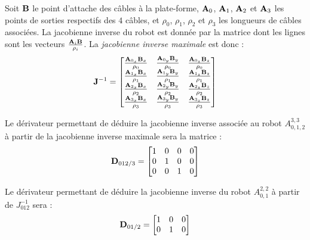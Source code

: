 Soit ${\bf B}$ le point d'attache des c\^ables \`a la plate-forme, ${\bf 
A}_0$, ${\bf A}_1$, ${\bf A}_2$ et ${\bf A}_3$ les points de sorties 
respectifs des $4$ c\^ables, et $\rho_0$, $\rho_1$, $\rho_2$ et $\rho_3$ les 
longueurs de c\^ables associ\'ees. La jacobienne inverse du robot est donn\'ee 
par la matrice dont les lignes sont les vecteurs $\frac {{\bf A}_i{\bf 
B}}{\rho_i}$. La {\it jacobienne inverse maximale} est donc :
\begin{equation}
{\bf J}^{-1} = 
\begin{bmatrix}
\frac {{\bf A}_{0_x}{\bf B}_x} {\rho_0} & \frac {{\bf A}_{0_y}{\bf B}_y} 
{\rho_0} & \frac {{\bf A}_{0_z}{\bf B}_z} {\rho_0} \\
\frac {{\bf A}_{1_x}{\bf B}_x} {\rho_1} & \frac {{\bf A}_{1_y}{\bf B}_y} 
{\rho_1} & \frac {{\bf A}_{1_z}{\bf B}_z} {\rho_1} \\
\frac {{\bf A}_{2_x}{\bf B}_x} {\rho_2} & \frac {{\bf A}_{2_y}{\bf B}_y} 
{\rho_2} & \frac {{\bf A}_{2_z}{\bf B}_z} {\rho_2} \\
\frac {{\bf A}_{3_x}{\bf B}_x} {\rho_3} & \frac {{\bf A}_{3_y}{\bf B}_y} 
{\rho_3} & \frac {{\bf A}_{3_z}{\bf B}_z} {\rho_3} \\
\end{bmatrix}
\label{chap01:eq01}
\end{equation}

Le d\'erivateur permettant de d\'eduire la jacobienne inverse associ\'ee au 
robot $A^{3,3}_{0, 1, 2}$ \`a partir de la jacobienne inverse maximale 
sera la matrice :
\begin{equation}
{\bf D}_{012/3} = 
\begin{bmatrix}
1 & 0 & 0 & 0\\
0 & 1 & 0 & 0\\
0 & 0 & 1 & 0
\end{bmatrix}
\label{chap01:eq02}
\end{equation}

Le d\'erivateur permettant de d\'eduire la jacobienne inverse du robot 
$A^{2,2}_{0, 1}$ \`a partir de $J^{-1}_{012}$ sera :
\begin{equation}
{\bf D}_{01/2} = 
\begin{bmatrix}
1 & 0 & 0\\
0 & 1 & 0
\end{bmatrix}
\label{chap01:eq03}
\end{equation}

